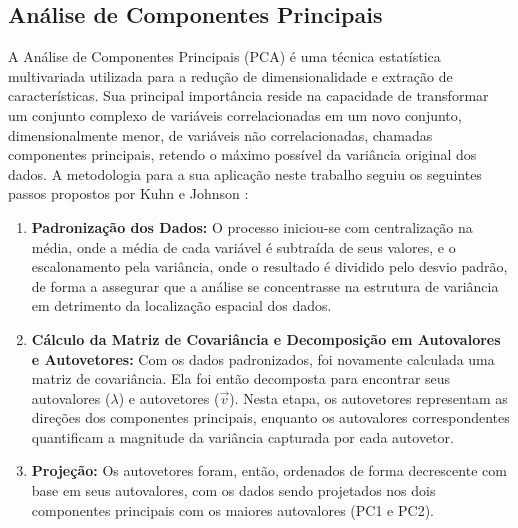 
\subsection{Análise de Componentes Principais}

A Análise de Componentes Principais (PCA) é uma técnica estatística multivariada utilizada para a redução de dimensionalidade e extração de características. Sua principal importância reside na capacidade de transformar um conjunto complexo de variáveis correlacionadas em um novo conjunto, dimensionalmente menor, de variáveis não correlacionadas, chamadas componentes principais, retendo o máximo possível da variância original dos dados. A metodologia para a sua aplicação neste trabalho seguiu os seguintes passos propostos por Kuhn e Johnson \cite{b8}:

\begin{enumerate}
    \item \textbf{Padronização dos Dados:} O processo iniciou-se com centralização na média, onde a média de cada variável é subtraída de seus valores, e o escalonamento pela variância, onde o resultado é dividido pelo desvio padrão, de forma a  assegurar que a análise se concentrasse na estrutura de variância em detrimento da localização espacial dos dados.
    \item \textbf{Cálculo da Matriz de Covariância e Decomposição em Autovalores e Autovetores:} Com os dados padronizados, foi novamente calculada uma matriz de covariância. Ela foi então decomposta para encontrar seus autovalores ($\lambda$) e autovetores ($\vec{v}$). Nesta etapa, os autovetores representam as direções dos componentes principais, enquanto os autovalores correspondentes quantificam a magnitude da variância capturada por cada autovetor.

    \item \textbf{Projeção:} Os autovetores foram, então, ordenados de forma decrescente com base em seus autovalores, com os dados sendo projetados nos dois componentes principais com os maiores autovalores (PC1 e PC2).
\end{enumerate}



